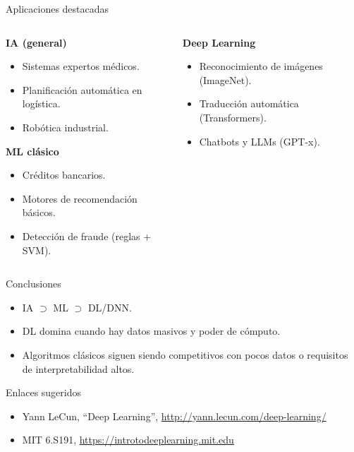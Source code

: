 \documentclass[8pt,spanish]{beamer}
\begin{document}
\begin{frame}{Aplicaciones destacadas}
  \begin{columns}[T]
    \begin{column}{.48\textwidth}
      \textbf{IA (general)}
      \begin{itemize}
        \item Sistemas expertos médicos.
        \item Planificación automática en logística.
        \item Robótica industrial.
      \end{itemize}
      \vspace{.5em}
      \textbf{ML clásico}
      \begin{itemize}
        \item Créditos bancarios.
        \item Motores de recomendación básicos.
        \item Detección de fraude (reglas + SVM).
      \end{itemize}
    \end{column}
    \begin{column}{.48\textwidth}
      \textbf{Deep Learning}
      \begin{itemize}
        \item Reconocimiento de imágenes (ImageNet).
        \item Traducción automática (Transformers).
        \item Chatbots y LLMs (GPT-x).
      \end{itemize}
    \end{column}
  \end{columns}
\end{frame}

\begin{frame}{Conclusiones}
  \begin{itemize}
    \item IA \(\supset\) ML \(\supset\) DL/DNN.
    \item DL domina cuando hay datos masivos y poder de cómputo.
    \item Algoritmos clásicos siguen siendo competitivos con pocos datos o
          requisitos de interpretabilidad altos.
  \end{itemize}
  \begin{block}{Enlaces sugeridos}
    \begin{itemize}
      \item Yann LeCun, “Deep Learning”, \url{http://yann.lecun.com/deep-learning/}
      \item MIT 6.S191, \url{https://introtodeeplearning.mit.edu}
    \end{itemize}
  \end{block}
\end{frame}
\end{document}
